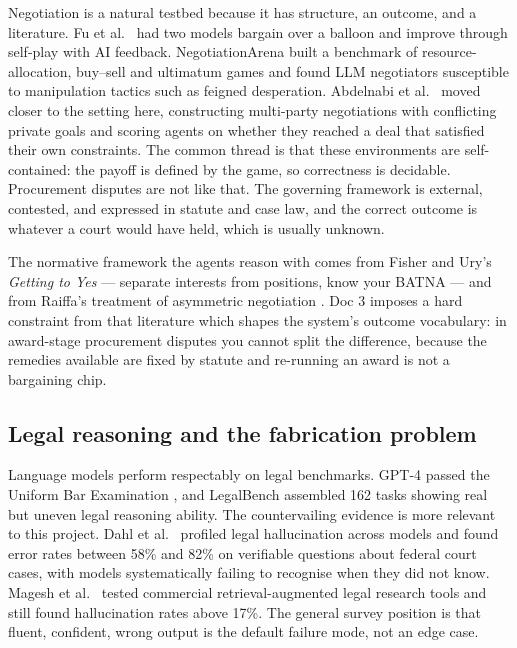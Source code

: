 Negotiation is a natural testbed because it has structure, an outcome, and a
literature. Fu et al.\ \cite{fu2023negotiation} had two models bargain over a
balloon and improve through self-play with AI feedback. NegotiationArena
\cite{bianchi2024negotiation} built a benchmark of resource-allocation,
buy--sell and ultimatum games and found LLM negotiators susceptible to
manipulation tactics such as feigned desperation. Abdelnabi et al.\
\cite{abdelnabi2024negotiation} moved closer to the setting here, constructing
multi-party negotiations with conflicting private goals and scoring agents on
whether they reached a deal that satisfied their own constraints. The common
thread is that these environments are self-contained: the payoff is defined by
the game, so correctness is decidable. Procurement disputes are not like that.
The governing framework is external, contested, and expressed in statute and case
law, and the correct outcome is whatever a court would have held, which is
usually unknown.

The normative framework the agents reason with comes from Fisher and Ury's
\emph{Getting to Yes} \cite{fisher2011getting} --- separate interests from
positions, know your BATNA --- and from Raiffa's treatment of asymmetric
negotiation \cite{raiffa1982art}. Doc 3 imposes a hard constraint from that
literature which shapes the system's outcome vocabulary: in award-stage
procurement disputes you cannot split the difference, because the remedies
available are fixed by statute and re-running an award is not a bargaining chip.

\subsection*{Legal reasoning and the fabrication problem}

Language models perform respectably on legal benchmarks. GPT-4 passed the Uniform
Bar Examination \cite{katz2024gpt4}, and LegalBench \cite{guha2023legalbench}
assembled 162 tasks showing real but uneven legal reasoning ability. The
countervailing evidence is more relevant to this project. Dahl et al.\
\cite{dahl2024legal} profiled legal hallucination across models and found error
rates between 58\% and 82\% on verifiable questions about federal court cases,
with models systematically failing to recognise when they did not know. Magesh
et al.\ \cite{magesh2024hallucination} tested commercial retrieval-augmented
legal research tools and still found hallucination rates above 17\%. The general
survey position \cite{ji2023survey} is that fluent, confident, wrong output is
the default failure mode, not an edge case.

